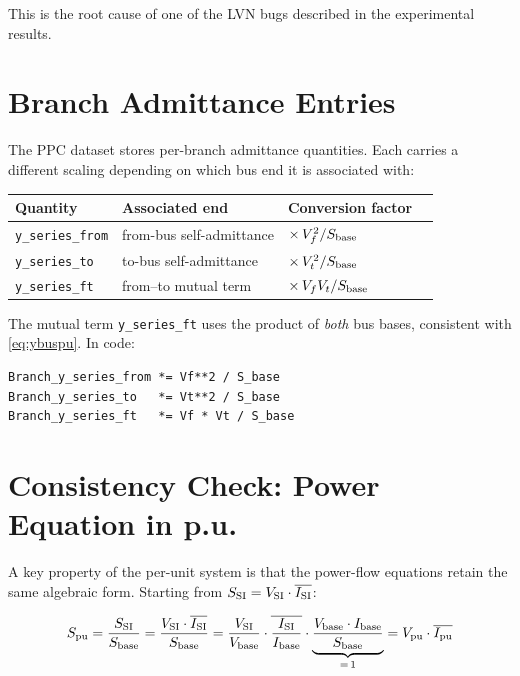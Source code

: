 \documentclass{article}
\begin{document}
This is the root cause of one of the LVN bugs described in the experimental
results.

\section{Branch Admittance Entries}

The PPC dataset stores per-branch admittance quantities.  Each carries a
different scaling depending on which bus end it is associated with:

\begin{center}
\begin{tabular}{llll}
\toprule
Quantity & Associated end & Conversion factor \\
\midrule
\texttt{y\_series\_from} & from-bus self-admittance & $\times\, V_f^2 / S_{\rm base}$ \\
\texttt{y\_series\_to}   & to-bus self-admittance   & $\times\, V_t^2 / S_{\rm base}$ \\
\texttt{y\_series\_ft}   & from–to mutual term      & $\times\, V_f V_t / S_{\rm base}$ \\
\bottomrule
\end{tabular}
\end{center}

The mutual term \texttt{y\_series\_ft} uses the product of \emph{both} bus
bases, consistent with \eqref{eq:ybuspu}.  In code:

\begin{verbatim}
Branch_y_series_from *= Vf**2 / S_base
Branch_y_series_to   *= Vt**2 / S_base
Branch_y_series_ft   *= Vf * Vt / S_base
\end{verbatim}

\section{Consistency Check: Power Equation in p.u.}

A key property of the per-unit system is that the power-flow equations
retain the same algebraic form.  Starting from $S_{\rm SI} = V_{\rm SI}
\cdot \overline{I_{\rm SI}}$:

\begin{equation}
  S_{\rm pu}
  = \frac{S_{\rm SI}}{S_{\rm base}}
  = \frac{V_{\rm SI} \cdot \overline{I_{\rm SI}}}{S_{\rm base}}
  = \frac{V_{\rm SI}}{V_{\rm base}}
    \cdot \overline{\frac{I_{\rm SI}}{I_{\rm base}}}
    \cdot \underbrace{\frac{V_{\rm base} \cdot I_{\rm base}}{S_{\rm base}}}_{=\,1}
  = V_{\rm pu} \cdot \overline{I_{\rm pu}}
\end{equation}
\end{document}
